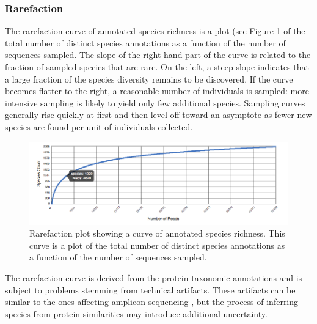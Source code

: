 \documentclass[12pt,fullpage]{report}
\begin{document}
\subsubsection*{Rarefaction}
The rarefaction curve of annotated species richness is a plot (see Figure \ref{fig:rarefaction} of the total number of distinct species annotations as a function of the number of sequences sampled.
The slope of the right-hand part of the curve is related to the fraction of sampled species that are rare.
On the left, a steep slope indicates that a large fraction of the species diversity remains to be discovered. If the curve becomes flatter to the right, a reasonable number of individuals is sampled: more intensive sampling is likely to yield only few additional species.
Sampling curves generally rise quickly at first and then level off toward an asymptote as fewer new species are found per unit of individuals collected.


\begin{figure}
\begin{center}
\includegraphics[width=6in]{Images/rarefaction.png}
\end{center}
\caption{
Rarefaction plot showing a curve of annotated species richness. This curve is a plot of the total number of distinct species annotations as a function of the number of sequences sampled.
}
\label{fig:rarefaction}
\end{figure}

The rarefaction curve is derived from the protein taxonomic annotations and is subject to problems stemming from technical artifacts. These artifacts can be similar to the ones affecting amplicon sequencing \cite{RARE}, but the process of inferring species from protein similarities may introduce additional uncertainty.

\end{document}
